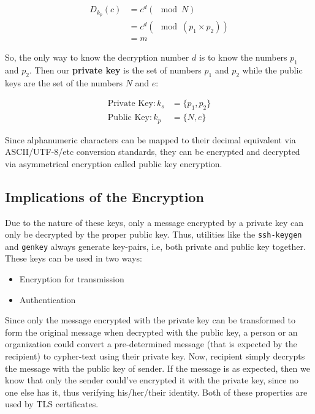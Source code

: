 \begin{align}
	D_{k_p}(c) &= c^d(\mod N) \\
	&=c^d (\mod (p_1 \times p_2)) \\ 
	&= m 
\end{align}

\noindent
So, the only way to know the decryption number $d$ is to know the numbers $p_1$ and $p_2$. Then our \textbf{private key} is the set of numbers $p_1$ and $p_2$ while the public keys are the set of the numbers $N$ and $e$:

\begin{align}
	\text{Private Key} : k_s &= \{ p_1, p_2 \} \\
	\text{Public Key} : k_p &= \{ N, e \}
\end{align}

Since alphanumeric characters can be mapped to their decimal equivalent via ASCII/UTF-8/etc conversion standards, they can be encrypted and decrypted via asymmetrical encryption called public key encryption. 

\subsection{Implications of the Encryption}
Due to the nature of these keys, only a message encrypted by a private key can only be decrypted by the proper public key. Thus, utilities like the \verb|ssh-keygen| and \verb|genkey| always generate key-pairs, i.e, both private and public key together. These keys can be used in two ways: 

\vspace{-10pt}
\begin{itemize}
	\item Encryption for transmission
	\item Authentication
\end{itemize}
\vspace{-10pt}

\noindent
Since only the message encrypted with the private key can be transformed to form the original message when decrypted with the public key, a person or an organization could convert a pre-determined message (that is expected by the recipient) to cypher-text using their private key. Now, recipient simply decrypts the message with the public key of sender. If the message is as expected, then we know that only the sender could've encrypted it with the private key, since no one else has it, thus verifying his/her/their identity. Both of these properties are used by TLS certificates. 

